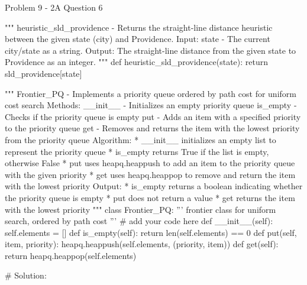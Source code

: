 \begin{problem}{Problem 9 - 2A Question 6}
\begin{highlight}[Solution]
\begin{code}[Python]
    """ heuristic_sld_providence - Returns the straight-line distance heuristic between the given state (city) and Providence.
        Input:
            state - The current city/state as a string.
        Output:
            The straight-line distance from the given state to Providence as an integer.
    """
    def heuristic_sld_providence(state):
        return sld_providence[state]
    
    """ Frontier_PQ - Implements a priority queue ordered by path cost for uniform cost search
        Methods:
            __init__ - Initializes an empty priority queue
            is_empty - Checks if the priority queue is empty
            put - Adds an item with a specified priority to the priority queue
            get - Removes and returns the item with the lowest priority from the priority queue
        Algorithm:
            * __init__ initializes an empty list to represent the priority queue
            * is_empty returns True if the list is empty, otherwise False
            * put uses heapq.heappush to add an item to the priority queue with the given priority
            * get uses heapq.heappop to remove and return the item with the lowest priority
        Output:
            * is_empty returns a boolean indicating whether the priority queue is empty
            * put does not return a value
            * get returns the item with the lowest priority
    """
    class Frontier_PQ:
        ''' frontier class for uniform search, ordered by path cost '''
        # add your code here
        def __init__(self):
            self.elements = []
        def is_empty(self):
            return len(self.elements) == 0
        def put(self, item, priority):
            heapq.heappush(self.elements, (priority, item))
        def get(self):
            return heapq.heappop(self.elements)
        
    # Solution:
    

\end{code}
\end{highlight}
\end{problem}
